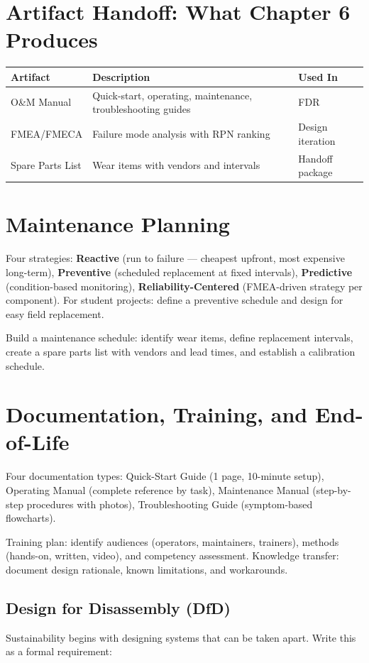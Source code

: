 \section{Artifact Handoff: What Chapter 6 Produces}
\begin{table}[htbp]\centering\small
\begin{tabularx}{\textwidth}{l X l}
\toprule
\textbf{Artifact} & \textbf{Description} & \textbf{Used In} \\
\midrule
O\&M Manual & Quick-start, operating, maintenance, troubleshooting guides & FDR \\
FMEA/FMECA & Failure mode analysis with RPN ranking & Design iteration \\
Spare Parts List & Wear items with vendors and intervals & Handoff package \\
\bottomrule
\end{tabularx}
\end{table}

\section{Maintenance Planning}
Four strategies: \textbf{Reactive} (run to failure — cheapest upfront, most expensive long-term), \textbf{Preventive} (scheduled replacement at fixed intervals), \textbf{Predictive} (condition-based monitoring), \textbf{Reliability-Centered} (FMEA-driven strategy per component). For student projects: define a preventive schedule and design for easy field replacement.

Build a maintenance schedule: identify wear items, define replacement intervals, create a spare parts list with vendors and lead times, and establish a calibration schedule.

\section{Documentation, Training, and End-of-Life}
Four documentation types: Quick-Start Guide (1 page, 10-minute setup), Operating Manual (complete reference by task), Maintenance Manual (step-by-step procedures with photos), Troubleshooting Guide (symptom-based flowcharts).

Training plan: identify audiences (operators, maintainers, trainers), methods (hands-on, written, video), and competency assessment. Knowledge transfer: document design rationale, known limitations, and workarounds.


\subsection{Design for Disassembly (DfD)}
Sustainability begins with designing systems that can be taken apart. Write this as a formal requirement:


